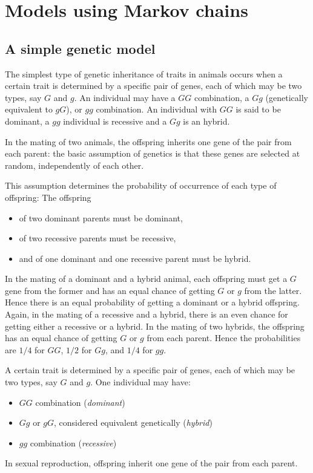 \chapter{Models using Markov chains}
\label{chap:genetics}

\section{A simple genetic model}
The simplest type of genetic inheritance of traits in animals occurs when a certain trait is determined by a specific pair of genes, each of which may be two types, say $G$ and $g$. An individual may have a $GG$ combination, a $Gg$ (genetically equivalent to $gG$), or $gg$ combination. An individual with $GG$ is said to be dominant, a $gg$ individual is recessive and a $Gg$ is an hybrid.

In the mating of two animals, the offspring inherits one gene of the pair from each parent: the basic assumption of genetics is that these genes are selected at
random, independently of each other.


This assumption determines the probability
of occurrence of each type of offspring: The offspring
\begin{itemize}
\item of two dominant parents must be dominant, 
\item of two recessive parents must be recessive,
\item and of one dominant and one recessive parent must be hybrid.
\end{itemize}
In the mating of a dominant and a hybrid animal, each offspring must get a
$G$ gene from the former and has an equal chance of getting $G$ or $g$ from the latter.
Hence there is an equal probability of getting a dominant or a hybrid offspring.
Again, in the mating of a recessive and a hybrid, there is an even chance for getting
either a recessive or a hybrid. In the mating of two hybrids, the offspring has an
equal chance of getting $G$ or $g$ from each parent. Hence the probabilities are $1/4$
for $GG$, $1/2$ for $Gg$, and $1/4$ for $gg$.

A certain trait is determined by a specific pair of genes, each of which may be two types, say $G$ and $g$. 
One individual may have:
\begin{itemize}
\item $GG$ combination (\emph{dominant})
\item $Gg$ or $gG$, considered equivalent genetically (\emph{hybrid})
\item $gg$ combination (\emph{recessive})
\end{itemize}
In sexual reproduction, offspring inherit one gene of the pair from each parent. 


